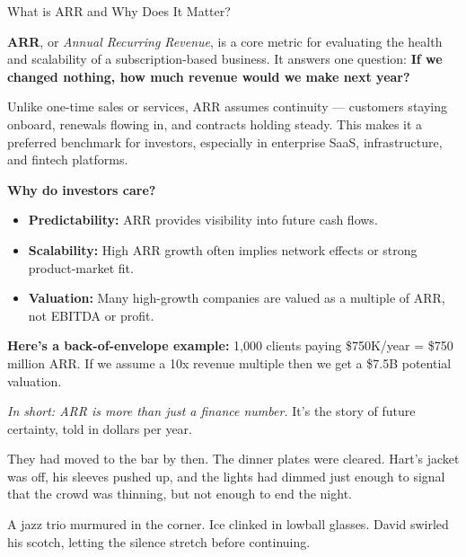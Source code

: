 \begin{TechnicalSidebar}{What is ARR and Why Does It Matter?}

  \textbf{ARR}, or \textit{Annual Recurring Revenue}, is a core metric for evaluating the health and scalability of 
  a subscription-based business.  
  It answers one question: \textbf{If we changed nothing, how much revenue would we make next year?}
  
  \medskip
  
  Unlike one-time sales or services, ARR assumes continuity — customers staying onboard, renewals flowing in, and 
  contracts holding steady.  
  This makes it a preferred benchmark for investors, especially in enterprise SaaS, infrastructure, and 
  fintech platforms.
  
  \medskip
  
  \textbf{Why do investors care?}

  \medskip
  
  \begin{itemize}
    \item \textbf{Predictability:} ARR provides visibility into future cash flows.
    \item \textbf{Scalability:} High ARR growth often implies network effects or strong product-market fit.
    \item \textbf{Valuation:} Many high-growth companies are valued as a multiple of ARR, not EBITDA or profit.
  \end{itemize}
  
  \medskip
  
  \textbf{Here's a back-of-envelope example:}  
  1,000 clients paying \$750K/year = \$750 million ARR.  
  If we assume a 10x revenue multiple then we get a \$7.5B potential valuation.
  
  \medskip
  
  \textit{In short: ARR is more than just a finance number.}  
  It’s the story of future certainty, told in dollars per year.
  
\end{TechnicalSidebar}

\medskip

They had moved to the bar by then. The dinner plates were cleared. Hart’s jacket was off, his sleeves pushed up, and the 
lights had dimmed just enough to signal that the crowd was thinning, but not enough to end the night.

A jazz trio murmured in the corner. Ice clinked in lowball glasses. David swirled his scotch, letting the silence stretch 
before continuing.

